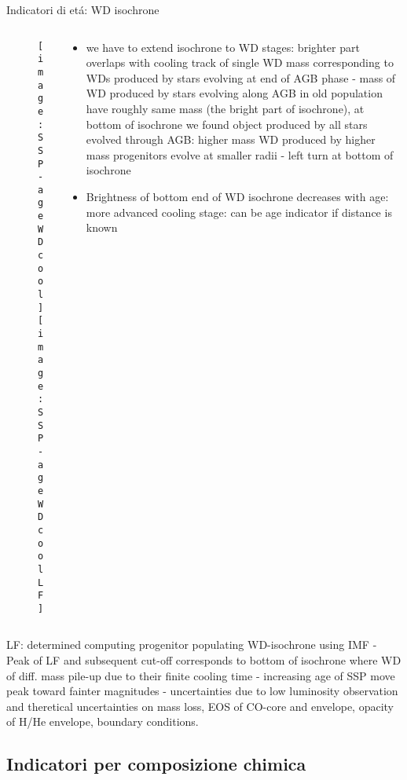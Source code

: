 \begin{frame}{Indicatori di et\'a: WD isochrone}
\begin{columns}[T]
	\begin{column}{0.5\textwidth}
		\begin{figure}[!ht]
			\texttt{[image: SSP-ageWDcool]}\label{fig:SSP-ageWDcool}
			\texttt{[image: SSP-ageWDcoolLF]}\label{fig:SSP-ageWDcoolLF}
		\end{figure}
	\end{column}
	\begin{column}{0.40\textwidth}
		\begin{itemize}
		\item we have to extend isochrone to WD stages: brighter part overlaps with cooling track of single WD mass corresponding to WDs produced by stars evolving at end of AGB phase - mass of WD produced by stars evolving along AGB in old population have roughly same mass (the bright part of isochrone), at bottom of isochrone we found object produced by all stars evolved through AGB: higher mass WD produced by higher mass progenitors evolve at smaller radii - left turn at bottom of isochrone
		\item Brightness of bottom end of WD isochrone decreases with age: more advanced cooling stage: can be age indicator if distance is known
		\end{itemize}
	\end{column}
\end{columns}
LF: determined computing progenitor populating WD-isochrone using IMF - Peak of LF and subsequent cut-off corresponds to bottom of isochrone where WD of diff. mass pile-up due to their finite cooling time - increasing age of SSP move peak toward fainter magnitudes - uncertainties due to low luminosity observation and theretical uncertainties on mass loss, EOS of CO-core and envelope, opacity of H/He envelope, boundary conditions.
\end{frame}

\subsection{Indicatori per composizione chimica}

